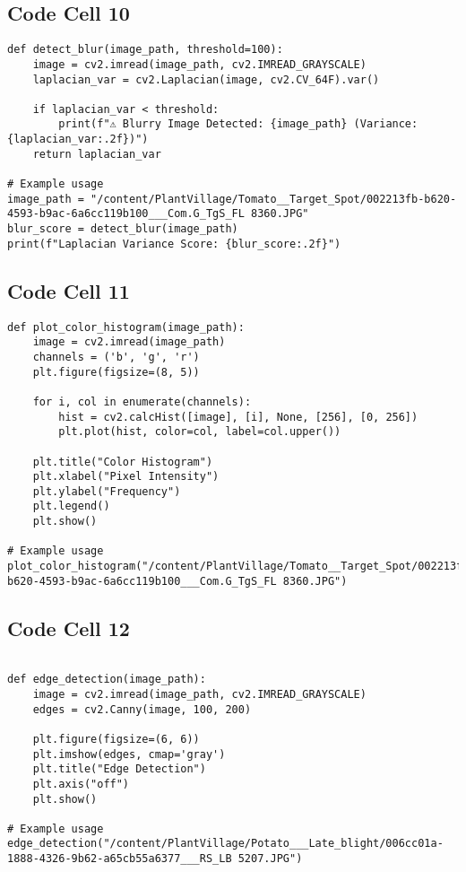 \documentclass{article}
\begin{document}
\subsection*{Code Cell 10}
\begin{lstlisting}
def detect_blur(image_path, threshold=100):
    image = cv2.imread(image_path, cv2.IMREAD_GRAYSCALE)
    laplacian_var = cv2.Laplacian(image, cv2.CV_64F).var()

    if laplacian_var < threshold:
        print(f"⚠ Blurry Image Detected: {image_path} (Variance: {laplacian_var:.2f})")
    return laplacian_var

# Example usage
image_path = "/content/PlantVillage/Tomato__Target_Spot/002213fb-b620-4593-b9ac-6a6cc119b100___Com.G_TgS_FL 8360.JPG"
blur_score = detect_blur(image_path)
print(f"Laplacian Variance Score: {blur_score:.2f}")
\end{lstlisting}

\subsection*{Code Cell 11}
\begin{lstlisting}
def plot_color_histogram(image_path):
    image = cv2.imread(image_path)
    channels = ('b', 'g', 'r')
    plt.figure(figsize=(8, 5))

    for i, col in enumerate(channels):
        hist = cv2.calcHist([image], [i], None, [256], [0, 256])
        plt.plot(hist, color=col, label=col.upper())

    plt.title("Color Histogram")
    plt.xlabel("Pixel Intensity")
    plt.ylabel("Frequency")
    plt.legend()
    plt.show()

# Example usage
plot_color_histogram("/content/PlantVillage/Tomato__Target_Spot/002213fb-b620-4593-b9ac-6a6cc119b100___Com.G_TgS_FL 8360.JPG")
\end{lstlisting}

\subsection*{Code Cell 12}
\begin{lstlisting}

def edge_detection(image_path):
    image = cv2.imread(image_path, cv2.IMREAD_GRAYSCALE)
    edges = cv2.Canny(image, 100, 200)

    plt.figure(figsize=(6, 6))
    plt.imshow(edges, cmap='gray')
    plt.title("Edge Detection")
    plt.axis("off")
    plt.show()

# Example usage
edge_detection("/content/PlantVillage/Potato___Late_blight/006cc01a-1888-4326-9b62-a65cb55a6377___RS_LB 5207.JPG")
\end{lstlisting}
\end{document}

